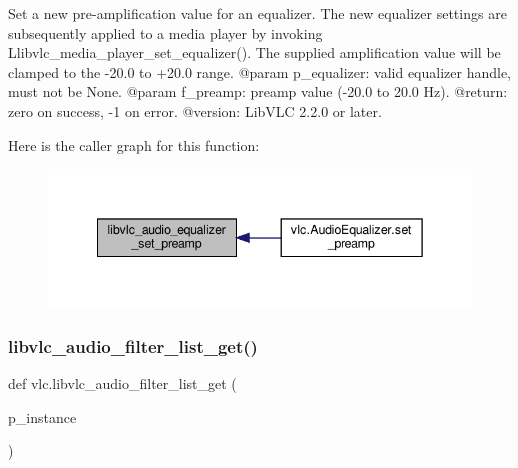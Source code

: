 \begin{DoxyVerb}Set a new pre-amplification value for an equalizer.
The new equalizer settings are subsequently applied to a media player by invoking
L{libvlc_media_player_set_equalizer}().
The supplied amplification value will be clamped to the -20.0 to +20.0 range.
@param p_equalizer: valid equalizer handle, must not be None.
@param f_preamp: preamp value (-20.0 to 20.0 Hz).
@return: zero on success, -1 on error.
@version: LibVLC 2.2.0 or later.
\end{DoxyVerb}
 Here is the caller graph for this function\+:
\nopagebreak
\begin{figure}[H]
\begin{center}
\leavevmode
\includegraphics[width=342pt]{namespacevlc_a10afe2e2760d5e0929afd7544bd08fc7_icgraph}
\end{center}
\end{figure}
\mbox{\label{namespacevlc_aff772ccc6681b4466b87298f076e20f5}} 
\subsubsection{\texorpdfstring{libvlc\+\_\+audio\+\_\+filter\+\_\+list\+\_\+get()}{libvlc\_audio\_filter\_list\_get()}}
{\footnotesize\ttfamily def vlc.\+libvlc\+\_\+audio\+\_\+filter\+\_\+list\+\_\+get (\begin{DoxyParamCaption}\item[{}]{p\+\_\+instance }\end{DoxyParamCaption})}

